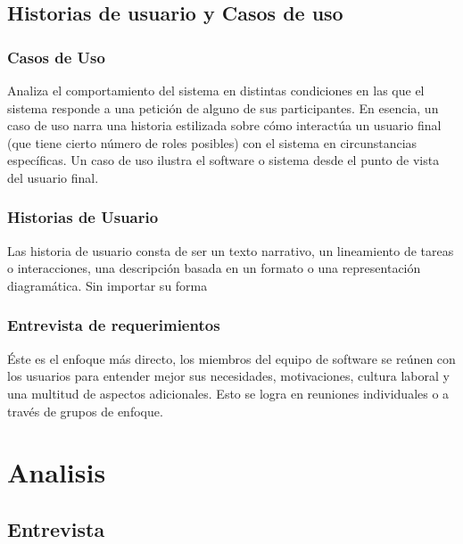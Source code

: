 \documentclass[spanish, 12pt]{article}
\begin{document}
	\subsection{Historias de usuario y Casos de uso}
	\label{historias-de-usuario-y-casos-de-uso}

	\subsubsection{Casos de Uso}
	\label{casos-de-uso}

	Analiza el comportamiento del sistema en distintas condiciones en las que el sistema
	responde a una petición de alguno de sus participantes. En esencia, un caso de
	uso narra una historia estilizada sobre cómo interactúa un usuario final (que
	tiene cierto número de roles posibles) con el sistema en circunstancias específicas.
	Un caso de uso ilustra el software o sistema desde el punto de vista del
	usuario final.

	\subsubsection{Historias de Usuario}
	\label{historias-de-usuario}

	Las historia de usuario consta de ser un texto narrativo, un lineamiento de
	tareas o interacciones, una descripción basada en un formato o una representación
	diagramática. Sin importar su forma

	\subsubsection{Entrevista de requerimientos}
	\label{entrevista-de-requerimientos}

	Éste es el enfoque más directo, los miembros del equipo de software se reúnen con
	los usuarios para entender mejor sus necesidades, motivaciones, cultura laboral
	y una multitud de aspectos adicionales. Esto se logra en reuniones
	individuales o a través de grupos de enfoque.

	\section{Analisis}
	\label{analisis}

	\subsection{Entrevista}
	\label{entrevista}
\end{document}
